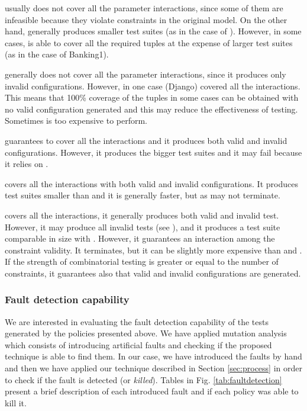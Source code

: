 \begin{tikzborder}{\cite{Gargantini16:validation}}
\begin{asparaitem}
		\item 
		\ccit usually does not cover all the parameter interactions, since some of them are infeasible because they violate constraints in the original model. On the other hand, \ccit generally produces smaller test suites (as in the case of \TLSChecker). However, in some cases, \ccit is able to cover all the required tuples at the expense of larger test suites (as in the case of Banking1). 
		
		\item 
		\cv generally does not cover all the parameter interactions, since it produces only invalid configurations. However, in one case (Django) \cv covered all the interactions. This means that 100\% coverage of the tuples in some cases can be obtained with no valid configuration generated and this may reduce the effectiveness of testing. %
		Sometimes \cv is too expensive to perform.
		
		\item
		\cucv guarantees to cover all the interactions and it produces both valid and invalid configurations. However, it produces the bigger test suites and it may fail because it relies on \cv.
		
		\item 
		\ValC covers all the interactions with both valid and invalid configurations. It produces test suites smaller than \cucv and it is generally faster, but as \cucv may not terminate.
		
		\item
		\CCi covers all the interactions, it generally produces both valid and invalid test. However, it may produce all invalid tests (see \TLSChecker), and it produces a test suite comparable in size with \ic. However, it guarantees an interaction among the constraint validity. It terminates, but it can be slightly more expensive than \ic and \ccit. If the strength of combinatorial testing is greater or equal to the number of constraints, it guarantees also that valid and invalid configurations are generated.
	\end{asparaitem}
	\be
	
	\subsubsection{Fault detection capability}
	
	\bb We are interested in evaluating the fault detection capability of the tests generated by the policies presented above. 
	We have applied mutation analysis \cite{surveyMutationTesting} which consists of introducing artificial faults and checking if the proposed technique is able to find them. In our case, we have introduced the faults by hand and then we have applied our technique described in Section \ref{sec:process} in order to check if the fault is detected (or \emph{killed}). 
	Tables in Fig. \ref{tab:faultdetection} present a brief description of each introduced fault and if each policy was able to kill it.
	

\end{tikzborder}
